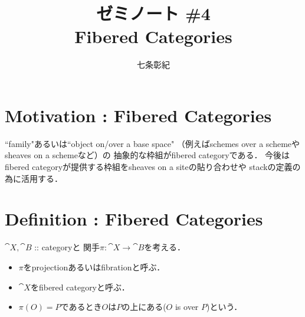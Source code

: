 \documentclass[a4paper, dvipdfmx]{jsarticle}
\begin{document}
\title{ゼミノート \#4 \\ Fibered Categories}
\author{七条彰紀}
\maketitle

\section{Motivation : Fibered Categories}
    ``family"あるいは``object on/over a base space"
    （例えばschemes over a schemeやsheaves on a schemeなど）の
    抽象的な枠組がfibered categoryである．
    今後はfibered categoryが提供する枠組をsheaves on a siteの貼り合わせや
    stackの定義の為に活用する．

\section{Definition : Fibered Categories}
    $\cat{X}, \cat{B}$ :: categoryと
    関手$\pi \colon \cat{X} \to \cat{B}$を考える．
    \begin{itemize}
    \item 
        $\pi$をprojectionあるいはfibrationと呼ぶ．
    \item
        $\cat{X}$をfibered categoryと呼ぶ．
    \item
        $\pi(O)=P$であるとき$O$は$P$の上にある($O$ is over $P$)という．
    \end{itemize}
\end{document}
